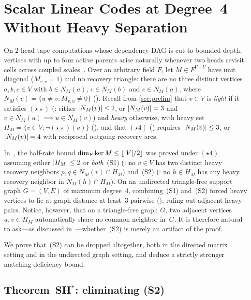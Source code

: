 \section{Scalar Linear Codes at Degree~4 Without Heavy Separation}\label{sec:crux}

On $2$-head tape computations whose dependency DAG is cut to bounded depth, vertices with up to four active parents arise
naturally whenever two heads revisit cells across coupled scales~\cite[Section~8]{EighthPaper2026}. Over an arbitrary field
$F$, let $M \in F^{V \times V}$ have unit diagonal ($M_{v,v} = 1$) and no recovery triangle: there are no three distinct
vertices $a, b, c \in V$ with $b \in N_M(a)$, $c \in N_M(b)$ and $c \in N_M(a)$, where $N_M(v) = \{u \ne v : M_{v,u} \ne 0\}$
(). Recall from \cref{sec:prelim} that $v \in V$ is \emph{light} if it satisfies $(\star\star)$
(: either $\lvert N_M(v) \rvert \le 2$, or $\lvert N_M(v) \rvert = 3$ and $v \in N_M(u) \implies u \in N_M(v)$)
and \emph{heavy} otherwise, with heavy set $H_M = \{v \in V : \neg(\star\star)(v)\}$ (), and
that $(\star 4)$ () requires $\lvert N_M(v) \rvert \le 3$, or $\lvert N_M(v) \rvert = 4$ with reciprocal
outgoing recovery arcs.

In~\cite[Section~8.2, Theorem~8.3]{EighthPaper2026}, the half-rate bound $\dim_F \ker M \le \lfloor \lvert V \rvert/2 \rfloor$ was
proved under $(\star 4)$ assuming either $\lvert H_M \rvert \le 2$ or \emph{both}~(S1) (: no $v \in V$
has two distinct heavy recovery neighbors $p, q \in N_M(v) \cap H_M$) and~(S2) (: no $h \in H_M$
has any heavy recovery neighbor in $N_M(h) \cap H_M$). On an undirected triangle-free support graph $G = (V, E)$ of maximum
degree~$4$, combining~(S1) and~(S2) forced heavy vertices to lie at graph distance at least~$3$ pairwise
(), ruling out adjacent heavy pairs. Notice, however, that on a triangle-free graph $G$, two
adjacent vertices $u, v \in H_M$ automatically share no common neighbor in~$G$. It is therefore natural to ask---as
discussed in~\cite[Section~8.2, Remark~8.8; Section~10, Problem~10.4]{EighthPaper2026}---whether~(S2) is merely an artifact
of the proof.

We prove that~(S2) can be dropped altogether, both in the directed matrix setting and in the undirected graph setting, and
deduce a strictly stronger matching-deficiency bound.

\subsection{Theorem~SH\texorpdfstring{$^*$}{*}: eliminating \texorpdfstring{(S2)}{(S2)}}\label{sec:crux-shstar}

